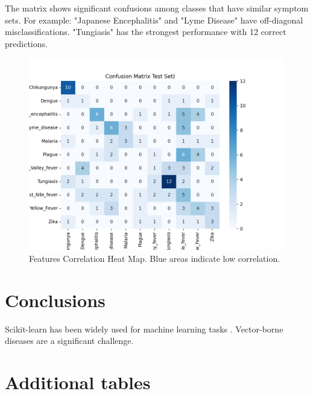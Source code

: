 \documentclass{article}
\begin{document}
The matrix shows significant confusions among classes that have similar symptom sets. For example:
"Japanese Encephalitis" and "Lyme Disease" have off-diagonal misclassifications.
"Tungiasis" has the strongest performance with 12 correct predictions.

\begin{figure}[H]  
    \centering
    \includegraphics[width=1\linewidth]{Confusion_Matrix_Test_Set.png}
    \caption{Features Correlation Heat Map. Blue areas indicate low correlation.}
    \vspace{-1em} %
    \end{figure}

\section{Conclusions}

Scikit-learn has been widely used for machine learning tasks \cite{disease_dataset2023}. Vector-borne diseases are a significant challenge\cite{disease_dataset2023}.

\appendix
\section{Additional tables}
\end{document}

